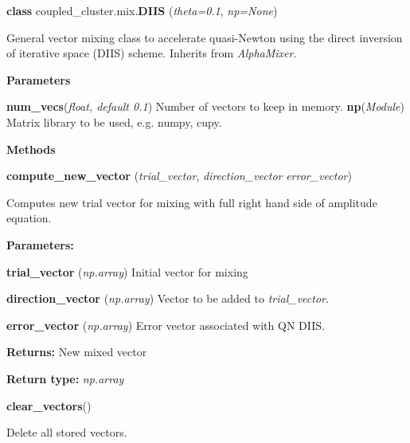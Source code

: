 \begin{tcolorbox}
    {\selectfont
    \textbf{class} coupled\_cluster.mix.\textbf{DIIS}
    (\emph{theta=0.1}, \emph{np=None})

    \vspace{1em}
    General vector mixing class to accelerate quasi-Newton using the 
    direct inversion of iterative space (DIIS) scheme. Inherits from 
    \emph{AlphaMixer}.
        
    \vspace{1em}
    \textbf{Parameters}

    \hspace{2em}\textbf{num\_vecs}(\emph{float, default 0.1}) 
        Number of vectors to keep in memory.
    \hspace{2em}\textbf{np}(\emph{Module})
        Matrix library to be used, e.g. numpy, cupy.

    \vspace{1em} 
    \textbf{Methods}

    \hspace{2em} \textbf{compute\_new\_vector}
        (\emph{trial\_vector}, \emph{direction\_vector} \emph{error\_vector})

        \begin{adjustwidth}{4em}{}
        Computes new trial vector for mixing with full right hand side of amplitude 
        equation.

        \textbf{Parameters:} 

            \hspace{1.5em}\textbf{trial\_vector} (\emph{np.array}) 
            Initial vector for mixing

            \hspace{1.5em}\textbf{direction\_vector} (\emph{np.array})
            Vector to be added to \emph{trial\_vector}.

            \hspace{1.5em}\textbf{error\_vector} (\emph{np.array})
            Error vector associated with QN DIIS. 

        \textbf{Returns:} New mixed vector

        \textbf{Return type:} \emph{np.array}
        \end{adjustwidth}

    \hspace{2em} \textbf{clear\_vectors}()
        \begin{adjustwidth}{4em}{}
        Delete all stored vectors.
        \end{adjustwidth}
    } 
\end{tcolorbox}